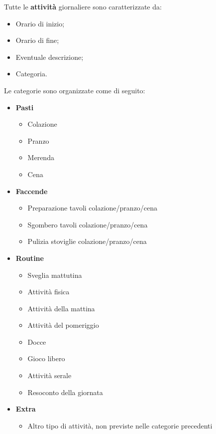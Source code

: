 \documentclass[11pt,a4paper]{article}
\begin{document}
Tutte le \textbf{attività} giornaliere sono caratterizzate da:

\begin{itemize}[nosep]
  \item Orario di inizio;
  \item Orario di fine;
  \item Eventuale descrizione;
  \item Categoria.
\end{itemize}

Le categorie sono organizzate come di seguito:

\begin{itemize}[nosep]
  \item \textbf{Pasti}
  \begin{itemize}[nosep]
    \item Colazione
    \item Pranzo
    \item Merenda
    \item Cena
  \end{itemize}
  \item \textbf{Faccende}
  \begin{itemize}[nosep]
    \item Preparazione tavoli colazione/pranzo/cena
    \item Sgombero tavoli colazione/pranzo/cena
    \item Pulizia stoviglie colazione/pranzo/cena
  \end{itemize}
  \item \textbf{Routine}
  \begin{itemize}[nosep]
    \item Sveglia mattutina
    \item Attività fisica
    \item Attività della mattina
    \item Attività del pomeriggio
    \item Docce
    \item Gioco libero
    \item Attività serale
    \item Resoconto della giornata
  \end{itemize}
  \item \textbf{Extra}
  \begin{itemize}[nosep]
    \item Altro tipo di attività, non previste nelle categorie precedenti
  \end{itemize}
\end{itemize}
\end{document}
